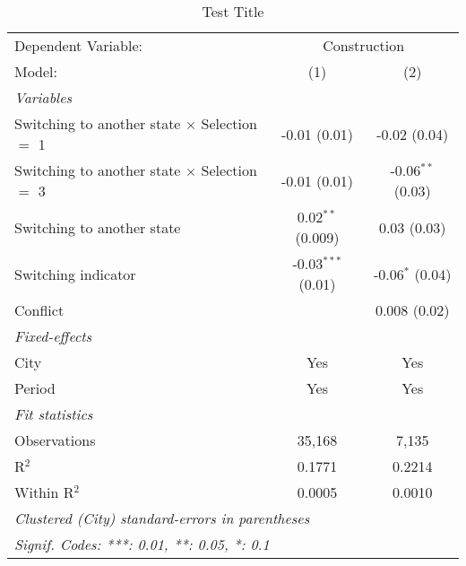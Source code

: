 \begin{table}[htbp]
   \caption{\label{tab:baseline_10y} Test Title}
   \centering
   \begin{tabular}{lcc}
      \tabularnewline \midrule \midrule
      Dependent Variable: & \multicolumn{2}{c}{Construction}\\
      Model:                                               & (1)                  & (2)\\  
      \midrule
      \emph{Variables}\\
      Switching to another state $\times$ Selection $=$ 1  & -0.01 (0.01)         & -0.02 (0.04)\\   
      Switching to another state $\times$ Selection $=$ 3  & -0.01 (0.01)         & -0.06$^{**}$ (0.03)\\   
      Switching to another state                           & 0.02$^{**}$ (0.009)  & 0.03 (0.03)\\   
      Switching indicator                                  & -0.03$^{***}$ (0.01) & -0.06$^{*}$ (0.04)\\   
      Conflict                                             &                      & 0.008 (0.02)\\   
      \midrule
      \emph{Fixed-effects}\\
      City                                                 & Yes                  & Yes\\  
      Period                                               & Yes                  & Yes\\  
      \midrule
      \emph{Fit statistics}\\
      Observations                                         & 35,168               & 7,135\\  
      R$^2$                                                & 0.1771               & 0.2214\\  
      Within R$^2$                                         & 0.0005               & 0.0010\\  
      \midrule \midrule
      \multicolumn{3}{l}{\emph{Clustered (City) standard-errors in parentheses}}\\
      \multicolumn{3}{l}{\emph{Signif. Codes: ***: 0.01, **: 0.05, *: 0.1}}\\
   \end{tabular}
\end{table}

